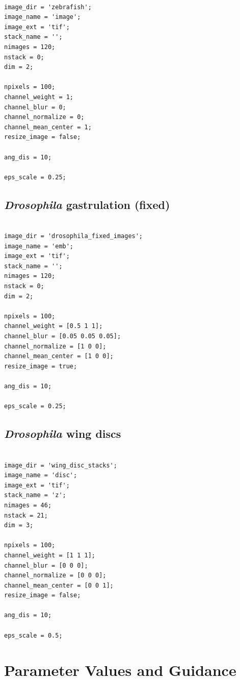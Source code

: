 \documentclass[12pt]{article}
\begin{document}
\begin{verbatim}

image_dir = 'zebrafish';
image_name = 'image';
image_ext = 'tif';
stack_name = '';
nimages = 120;
nstack = 0;
dim = 2;

npixels = 100;
channel_weight = 1;
channel_blur = 0;
channel_normalize = 0;
channel_mean_center = 1;
resize_image = false;

ang_dis = 10;

eps_scale = 0.25;

\end{verbatim}


\subsection{{\em Drosophila} gastrulation (fixed)}

\begin{verbatim}

image_dir = 'drosophila_fixed_images';
image_name = 'emb';
image_ext = 'tif';
stack_name = '';
nimages = 120;
nstack = 0;
dim = 2;

npixels = 100;
channel_weight = [0.5 1 1];
channel_blur = [0.05 0.05 0.05];
channel_normalize = [1 0 0];
channel_mean_center = [1 0 0];
resize_image = true;

ang_dis = 10;

eps_scale = 0.25;

\end{verbatim}


\subsection{{\em Drosophila} wing discs}

\begin{verbatim}

image_dir = 'wing_disc_stacks';
image_name = 'disc';
image_ext = 'tif';
stack_name = 'z';
nimages = 46;
nstack = 21;
dim = 3;

npixels = 100;
channel_weight = [1 1 1];
channel_blur = [0 0 0];
channel_normalize = [0 0 0];
channel_mean_center = [0 0 1];
resize_image = false;

ang_dis = 10;

eps_scale = 0.5;
\end{verbatim}

\section{Parameter Values and Guidance}
\end{document}
